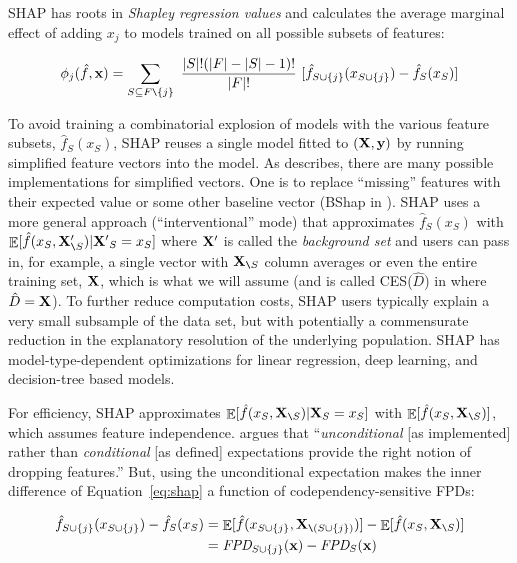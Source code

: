 \documentclass[smallextended]{svjour3}       %
\renewcommand{\eqref}[1]{Equation~\ref{#1}}
\renewcommand{\slash}{\texttt{\char`\\}}
\DeclareMathOperator{\Ex}{\mathbb{E}}
\begin{document}

SHAP \citep{shap} has roots in {\em Shapley regression values} \citep{shapley-regression} and calculates the average marginal effect of adding $x_j$ to models trained on all possible  subsets of features:
\vspace{-1mm}

\begin{equation}\label{eq:shap}
\phi_j(\hat{f},{\bf x}) = \sum_{S \subseteq F \slash \{j\}}\
\frac{|S|!(|F|-|S|-1)!}{|F|!}\
 [ \hat{f}_{S \cup \{j\}}(x_{S \cup \{j\}}) - \hat{f}_S(x_S) ]
\end{equation}\vspace{-1mm}

To avoid training a combinatorial explosion of models with the various feature subsets, $\hat{f}_S(x_S)$, SHAP reuses a single model fitted to $(\bf X, y)$ by running simplified feature vectors into the model. As  \citet{manyshap} describes, there are many possible implementations for simplified vectors. One is to replace ``missing''  features with their expected value or some other baseline vector (BShap in \citealt{manyshap}). SHAP uses a more general approach (``interventional'' mode) that approximates $\hat{f}_S(x_S)$ with $\Ex[\hat{f}(x_{S},{\bf X}'_{\slash S}) | {\bf X'}_S = x_S]$ where ${\bf X}'$ is called the {\em background set} and users can pass in, for example, a single vector with ${\bf X}_{\slash S}$ column averages or even the entire training set, $\bf X$, which is what we will assume (and is called CES($\hat{D}$) in \citealt{manyshap} where $\hat{D}={\bf X}$). To further reduce computation costs, SHAP users typically explain a very small subsample of the data set, but with potentially a commensurate reduction in the explanatory resolution of the underlying population. SHAP has model-type-dependent optimizations for linear regression, deep learning, and decision-tree based models.

For efficiency, SHAP approximates $\Ex[\hat{f}(x_{S},{\bf X}_{\slash S}) | {\bf X}_S = x_S]$ with $\Ex[\hat{f}(x_{S},{\bf X}_{\slash S})]$, which assumes feature independence. \citep{janzing2019feature} argues that ``{\em unconditional} [as implemented] rather than {\em conditional} [as defined] expectations provide the right notion of dropping features.''  But, using the unconditional expectation makes the inner difference of \eqref{eq:shap} a function of codependency-sensitive FPDs:

\vspace{-4mm}\begin{equation}
\begin{split}
\hat{f}_{S \cup \{j\}}(x_{S \cup \{j\}}) - \hat{f}_S(x_S) & = \Ex[\hat{f}(x_{S \cup \{j\}},{\bf X}_{\slash (S \cup \{j\})})] - \Ex[\hat{f}(x_{S},{\bf X}_{\slash S})]\\
 & = \text{\it FPD}_{S \cup \{j\}}({\bf x}) - \text{\it FPD}_{S}({\bf x})
\end{split}
\end{equation}\vspace{-2mm}
\end{document}
